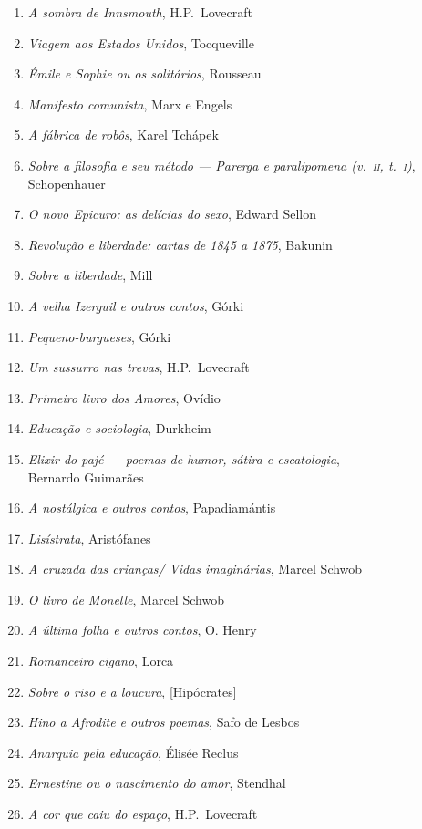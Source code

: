 \begin{enumerate}
\item \textit{A sombra de Innsmouth}, H.P.~Lovecraft
\item \textit{Viagem aos Estados Unidos}, Tocqueville
\item \textit{Émile e Sophie ou os solitários}, Rousseau 
\item \textit{Manifesto comunista}, Marx e Engels
\item \textit{A fábrica de robôs}, Karel Tchápek 
\item \textit{Sobre a filosofia e seu método --- Parerga e paralipomena (v.~\textsc{ii}, t.~\textsc{i})},\\ Schopenhauer 
\item \textit{O novo Epicuro: as delícias do sexo}, Edward Sellon
\item \textit{Revolução e liberdade: cartas de 1845 a 1875}, Bakunin
\item \textit{Sobre a liberdade}, Mill
\item \textit{A velha Izerguil e outros contos}, Górki
\item \textit{Pequeno-burgueses}, Górki
\item \textit{Um sussurro nas trevas}, H.P.~Lovecraft
\item \textit{Primeiro livro dos Amores}, Ovídio
\item \textit{Educação e sociologia}, Durkheim
\item \textit{Elixir do pajé --- poemas de humor, sátira e escatologia},\\ Bernardo Guimarães
\item \textit{A nostálgica e outros contos}, Papadiamántis 
\item \textit{Lisístrata}, Aristófanes 
\item \textit{A cruzada das crianças/ Vidas imaginárias}, Marcel Schwob
\item \textit{O livro de Monelle}, Marcel Schwob
\item \textit{A última folha e outros contos}, O. Henry
\item \textit{Romanceiro cigano}, Lorca
\item \textit{Sobre o riso e a loucura}, [Hipócrates]
\item \textit{Hino a Afrodite e outros poemas}, Safo de Lesbos 
\item \textit{Anarquia pela educação}, Élisée Reclus 
\item \textit{Ernestine ou o nascimento do amor}, Stendhal
\item \textit{A cor que caiu do espaço}, H.P.~Lovecraft

\end{enumerate}
